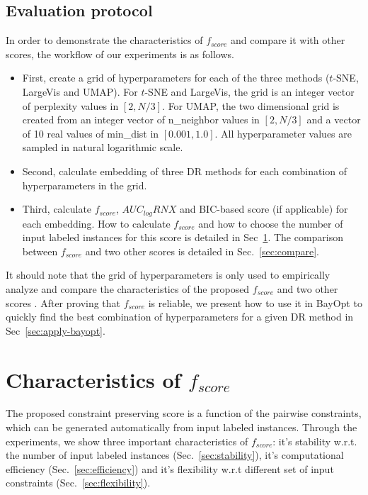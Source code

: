\subsection{Evaluation protocol}\label{sec:xp:protocol}
In order to demonstrate the characteristics of $f_{score}$ and compare it with other scores, the workflow of our experiments is as follows.
\begin{itemize}
\item First, create a grid of hyperparameters for each of the three methods ($t$-SNE, LargeVis and UMAP).
  For $t$-SNE and LargeVis, the grid is an integer vector of perplexity values in $[2,N/3]$.
  For UMAP, the two dimensional grid is created from an integer vector of {n\_neighbor} values in $[2,N/3]$ and a vector of 10 real values of {min\_dist} in $[0.001, 1.0]$.
  All hyperparameter values are sampled in natural logarithmic scale.
\item Second, calculate embedding of three DR methods for each combination of hyperparameters in the grid.
\item Third, calculate $f_{score}$, $AUC_{log}RNX$ and BIC-based score (if applicable) for each embedding.
  How to calculate $f_{score}$ and how to choose the number of input labeled instances for this score is detailed in Sec~\ref{sec:characteristics}.
  The comparison between $f_{score}$ and two other scores is detailed in Sec.~\ref{sec:compare}.
\end{itemize}

It should note that the grid of hyperparameters is only used to empirically analyze and compare the characteristics of the proposed $f_{score}$ and two other scores .
After proving that $f_{score}$ is reliable, we present how to use it in BayOpt to quickly find the best combination of hyperparameters for a given DR method in Sec~\ref{sec:apply-bayopt}.

\section{Characteristics of $f_{score}$}\label{sec:characteristics}

The proposed constraint preserving score is a function of the pairwise constraints, which can be generated automatically from input labeled instances.
Through the experiments, we show three important characteristics of $f_{score}$: it's stability w.r.t. the number of input labeled instances (Sec.~\ref{sec:stability}), it's computational efficiency (Sec.~\ref{sec:efficiency}) and it's flexibility w.r.t different set of input constraints (Sec.~\ref{sec:flexibility}).

